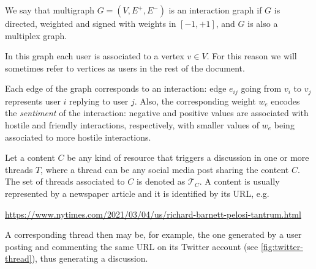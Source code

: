 \begin{definition}
	We say that multigraph $G=(V,E^+,E^-)$ is an interaction graph if $G$ is
	directed, weighted and signed with weights in $[-1,+1]$, and $G$ is also a
	multiplex graph.
\end{definition}

In this graph each user is associated to a vertex $v \in V$. For this reason we
will sometimes refer to vertices as users in the rest of the document.

Each edge of the graph corresponds to an interaction: edge $e_{ij}$
going from $v_i$ to $v_j$ represents user $i$ replying to
user $j$. Also, the corresponding weight $w_e$ encodes the \emph{sentiment} of
the interaction: negative and positive values are associated with hostile and
friendly interactions, respectively, with smaller values of $w_e$ being
associated to more hostile interactions.




Let a content $C$ be any kind of resource that triggers a discussion in one or
more threads $T$, where a thread can be any social media post sharing the content $C$. The set of threads associated to $C$ is denoted as
$\mathcal{T}_{C} $. A content is usually represented by a newspaper article and
it is identified by its URL, e.g.

	{\footnotesize
		\begin{center}
			\url{https://www.nytimes.com/2021/03/04/us/richard-barnett-pelosi-tantrum.html}
		\end{center}
	}

A corresponding thread then may be, for example, the one generated by a user
posting and commenting the same URL on its Twitter account (see
\autoref{fig:twitter-thread}), thus generating a discussion.

